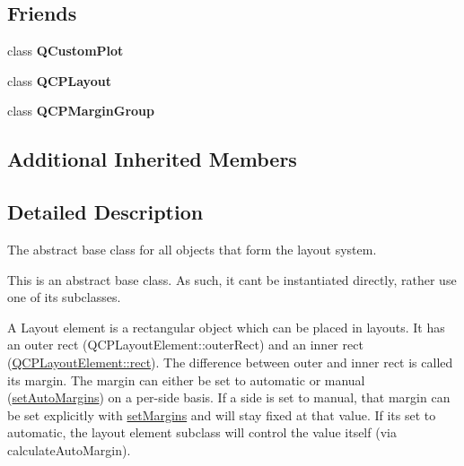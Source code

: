\subsection*{Friends}
\begin{DoxyCompactItemize}
\item 
\mbox{\label{class_q_c_p_layout_element_a1cdf9df76adcfae45261690aa0ca2198}} 
class {\bfseries Q\+Custom\+Plot}
\item 
\mbox{\label{class_q_c_p_layout_element_a588aac0a0d721f6c5f10126d8596a20f}} 
class {\bfseries Q\+C\+P\+Layout}
\item 
\mbox{\label{class_q_c_p_layout_element_ad077a686e85ab6fa03dcb2fd37fc499a}} 
class {\bfseries Q\+C\+P\+Margin\+Group}
\end{DoxyCompactItemize}
\subsection*{Additional Inherited Members}


\subsection{Detailed Description}
The abstract base class for all objects that form the layout system. 

This is an abstract base class. As such, it can\textquotesingle{}t be instantiated directly, rather use one of its subclasses.

A Layout element is a rectangular object which can be placed in layouts. It has an outer rect (Q\+C\+P\+Layout\+Element\+::outer\+Rect) and an inner rect (\mbox{\hyperlink{class_q_c_p_layout_element_a208effccfe2cca4a0eaf9393e60f2dd4}{Q\+C\+P\+Layout\+Element\+::rect}}). The difference between outer and inner rect is called its margin. The margin can either be set to automatic or manual (\mbox{\hyperlink{class_q_c_p_layout_element_accfda49994e3e6d51ed14504abf9d27d}{set\+Auto\+Margins}}) on a per-\/side basis. If a side is set to manual, that margin can be set explicitly with \mbox{\hyperlink{class_q_c_p_layout_element_a8f450b1f3f992ad576fce2c63d8b79cf}{set\+Margins}} and will stay fixed at that value. If it\textquotesingle{}s set to automatic, the layout element subclass will control the value itself (via calculate\+Auto\+Margin).

